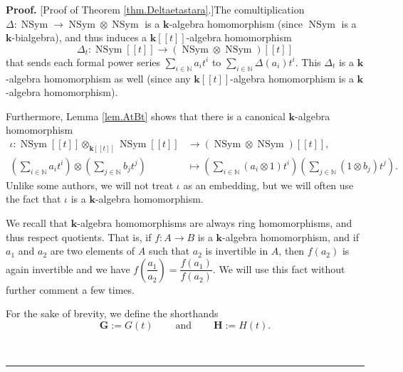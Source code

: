 \documentclass[numbers=enddot,12pt,final,onecolumn,notitlepage]{scrartcl}%
\theoremstyle{definition}
\newenvironment{proof}[1][Proof]{\noindent\textbf{#1.} }{\ \rule{0.5em}{0.5em}}
\let\sumnonlimits\sum
\renewcommand{\sum}{\sumnonlimits\limits}
\begin{document}
\begin{proof}
[Proof of Theorem \ref{thm.Deltaetastara}.]The comultiplication $\Delta
:\operatorname*{NSym}\rightarrow\operatorname*{NSym}\otimes
\operatorname*{NSym}$ is a $\mathbf{k}$-algebra homomorphism (since
$\operatorname*{NSym}$ is a $\mathbf{k}$-bialgebra), and thus induces a
$\mathbf{k}\left[  \left[  t\right]  \right]  $-algebra homomorphism%
\[
\Delta_{t}:\operatorname*{NSym}\left[  \left[  t\right]  \right]
\rightarrow\left(  \operatorname*{NSym}\otimes\operatorname*{NSym}\right)
\left[  \left[  t\right]  \right]
\]
that sends each formal power series $\sum_{i\in\mathbb{N}}a_{i}t^{i}$ to
$\sum_{i\in\mathbb{N}}\Delta\left(  a_{i}\right)  t^{i}$. This $\Delta_{t}$ is
a $\mathbf{k}$-algebra homomorphism as well (since any $\mathbf{k}\left[
\left[  t\right]  \right]  $-algebra homomorphism is a $\mathbf{k}$-algebra homomorphism).

Furthermore, Lemma \ref{lem.AtBt} shows that there is a canonical $\mathbf{k}%
$-algebra homomorphism%
\begin{align*}
\iota:\operatorname*{NSym}\left[  \left[  t\right]  \right]  \otimes
_{\mathbf{k}\left[  \left[  t\right]  \right]  }\operatorname*{NSym}\left[
\left[  t\right]  \right]   &  \rightarrow\left(  \operatorname*{NSym}%
\otimes\operatorname*{NSym}\right)  \left[  \left[  t\right]  \right]  ,\\
\left(  \sum_{i\in\mathbb{N}}a_{i}t^{i}\right)  \otimes\left(  \sum
_{j\in\mathbb{N}}b_{j}t^{j}\right)   &  \mapsto\left(  \sum_{i\in\mathbb{N}%
}\left(  a_{i}\otimes1\right)  t^{i}\right)  \left(  \sum_{j\in\mathbb{N}%
}\left(  1\otimes b_{j}\right)  t^{j}\right)  .
\end{align*}
Unlike some authors, we will not treat $\iota$ as an embedding, but we will
often use the fact that $\iota$ is a $\mathbf{k}$-algebra homomorphism.

We recall that $\mathbf{k}$-algebra homomorphisms are always ring
homomorphisms, and thus respect quotients. That is, if $f:A\rightarrow B$ is a
$\mathbf{k}$-algebra homomorphism, and if $a_{1}$ and $a_{2}$ are two elements
of $A$ such that $a_{2}$ is invertible in $A$, then $f\left(  a_{2}\right)  $
is again invertible and we have $f\left(  \dfrac{a_{1}}{a_{2}}\right)
=\dfrac{f\left(  a_{1}\right)  }{f\left(  a_{2}\right)  }$. We will use this
fact without further comment a few times.

For the sake of brevity, we define the shorthands%
\[
\mathbf{G}:=G\left(  t\right)  \ \ \ \ \ \ \ \ \ \ \text{and}%
\ \ \ \ \ \ \ \ \ \ \mathbf{H}:=H\left(  t\right)  .
\]



\end{proof}
\end{document}

